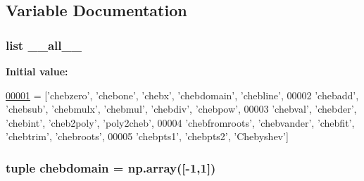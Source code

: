 \subsection{Variable Documentation}
\hypertarget{namespacepyneb_1_1utils_1_1chebyshev_aa4a022e6ddacd362b83964da5cc5d044}{
\subsubsection[{\-\_\-\-\_\-all\-\_\-\-\_\-}]{\setlength{\rightskip}{0pt plus 5cm}list \-\_\-\-\_\-all\-\_\-\-\_\-}}\label{namespacepyneb_1_1utils_1_1chebyshev_aa4a022e6ddacd362b83964da5cc5d044}
{\bfseries Initial value\-:}
\begin{DoxyCode}
\hypertarget{namespacepyneb_1_1utils_1_1chebyshev_l00001}{}\hyperlink{namespacepyneb_1_1utils_1_1chebyshev}{00001} = [\textcolor{stringliteral}{'chebzero'}, \textcolor{stringliteral}{'chebone'}, \textcolor{stringliteral}{'chebx'}, \textcolor{stringliteral}{'chebdomain'}, \textcolor{stringliteral}{'chebline'},
00002         \textcolor{stringliteral}{'chebadd'}, \textcolor{stringliteral}{'chebsub'}, \textcolor{stringliteral}{'chebmulx'}, \textcolor{stringliteral}{'chebmul'}, \textcolor{stringliteral}{'chebdiv'}, \textcolor{stringliteral}{'chebpow'},
00003         \textcolor{stringliteral}{'chebval'}, \textcolor{stringliteral}{'chebder'}, \textcolor{stringliteral}{'chebint'}, \textcolor{stringliteral}{'cheb2poly'}, \textcolor{stringliteral}{'poly2cheb'},
00004         \textcolor{stringliteral}{'chebfromroots'}, \textcolor{stringliteral}{'chebvander'}, \textcolor{stringliteral}{'chebfit'}, \textcolor{stringliteral}{'chebtrim'}, \textcolor{stringliteral}{'chebroots'},
00005         \textcolor{stringliteral}{'chebpts1'}, \textcolor{stringliteral}{'chebpts2'}, \textcolor{stringliteral}{'Chebyshev'}]
\end{DoxyCode}
\hypertarget{namespacepyneb_1_1utils_1_1chebyshev_abd5a8e86847ca6ea59d2a192f28604d4}{
\subsubsection[{chebdomain}]{\setlength{\rightskip}{0pt plus 5cm}tuple chebdomain = np.\-array(\mbox{[}-\/1,1\mbox{]})}}\label{namespacepyneb_1_1utils_1_1chebyshev_abd5a8e86847ca6ea59d2a192f28604d4}
